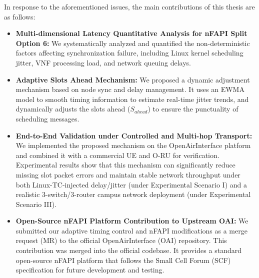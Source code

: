 \documentclass[../my_ntust_thesis.tex]{subfiles}
\begin{document}
In response to the aforementioned issues, the main contributions of this thesis are as follows:
\begin{itemize}
\item \textbf{Multi-dimensional Latency Quantitative Analysis for nFAPI Split Option 6:} We systematically analyzed and quantified the non-deterministic factors affecting synchronization failure, including Linux kernel scheduling jitter, VNF processing load, and network queuing delays.
\item \textbf{Adaptive Slots Ahead Mechanism:} We proposed a dynamic adjustment mechanism based on node sync and delay management. It uses an EWMA model to smooth timing information to estimate real-time jitter trends, and dynamically adjusts the slots ahead ($S_{ahead}$) to ensure the punctuality of scheduling messages.
\item \textbf{End-to-End Validation under Controlled and Multi-hop Transport:} We implemented the proposed mechanism on the OpenAirInterface platform and combined it with a commercial UE and O-RU for verification. Experimental results show that this mechanism can significantly reduce missing slot packet errors and maintain stable network throughput under both Linux-TC-injected delay/jitter (under Experimental Scenario I) and a realistic 3-switch/3-router campus network deployment (under Experimental Scenario III).
\item \textbf{Open-Source nFAPI Platform Contribution to Upstream OAI:} We submitted our adaptive timing control and nFAPI modifications as a merge request (MR) to the official OpenAirInterface (OAI) \cite{oai_gitlab_ci} repository. This contribution was merged into the official codebase. It provides a standard open-source nFAPI platform that follows the Small Cell Forum (SCF) specification for future development and testing.
\end{itemize}
\end{document}
